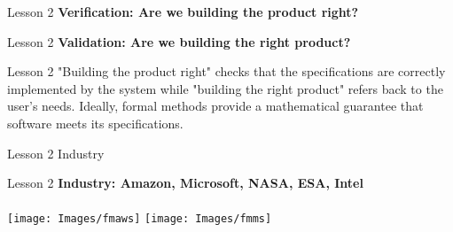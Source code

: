 \documentclass[aspectratio=1610]{beamer}
\begin{document}
\begin{frame}{Lesson 2}{}
\LARGE
    \textbf{Verification: Are we building the product right?}

\end{frame}

\begin{frame}{Lesson 2}{}
\LARGE
    \textbf{Validation: Are we building the right product?}
\end{frame}

\begin{frame}{Lesson 2}{}
\LARGE
"Building the product right" checks that the specifications are correctly implemented by the system while "building the right product" refers back to the user's needs. Ideally, formal methods provide a mathematical guarantee that software meets its specifications.
\end{frame}


\begin{frame}{Lesson 2}{}
	\Huge Industry
\end{frame}


\begin{frame}
\end{frame}

\begin{frame}{Lesson 2}{}
\LARGE
\textbf{Industry: Amazon, Microsoft, NASA, ESA, Intel}\\~\\
\texttt{[image: Images/fmaws]}
\texttt{[image: Images/fmms]}
\end{frame}





\end{document}
